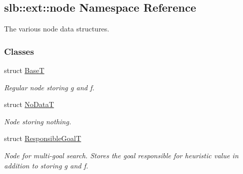 \hypertarget{namespaceslb_1_1ext_1_1node}{}\subsection{slb\+:\+:ext\+:\+:node Namespace Reference}
\label{namespaceslb_1_1ext_1_1node}


The various node data structures.  


\subsubsection*{Classes}
\begin{DoxyCompactItemize}
\item 
struct \hyperlink{structslb_1_1ext_1_1node_1_1BaseT}{BaseT}
\begin{DoxyCompactList}\small\item\em Regular node storing {\ttfamily g} and {\ttfamily f}. \end{DoxyCompactList}\item 
struct \hyperlink{structslb_1_1ext_1_1node_1_1NoDataT}{No\+DataT}
\begin{DoxyCompactList}\small\item\em Node storing nothing. \end{DoxyCompactList}\item 
struct \hyperlink{structslb_1_1ext_1_1node_1_1ResponsibleGoalT}{Responsible\+GoalT}
\begin{DoxyCompactList}\small\item\em Node for multi-\/goal search. Stores the goal responsible for heuristic value in addition to storing {\ttfamily g} and {\ttfamily f}. \end{DoxyCompactList}\end{DoxyCompactItemize}
